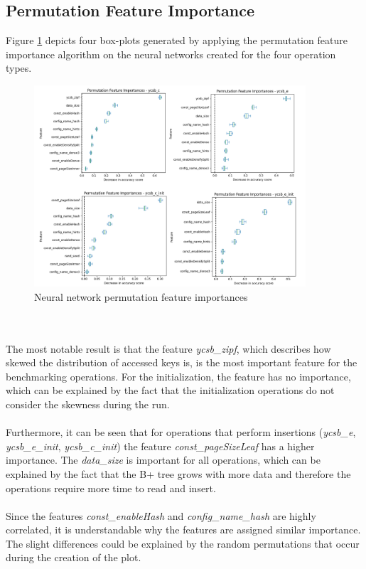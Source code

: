 \subsection{Permutation Feature Importance}
Figure \ref{fig:nnfeatimp} depicts four box-plots generated by applying the permutation feature importance algorithm on the neural networks created for the four operation types.
\begin{figure}[h]
      \centering
      \includegraphics[width=0.9\textwidth]{images/nn_fi.png}
      \caption{Neural network permutation feature importances}
      \label{fig:nnfeatimp}
  \end{figure}
\\\\
The most notable result is that the feature \textit{ycsb\_zipf}, which describes how skewed the distribution of accessed keys is, is the most important feature for the benchmarking operations. For the initialization, the feature has no importance, which can be explained by the fact that the initialization operations do not consider the skewness during the run. 
\\\\
Furthermore, it can be seen that for operations that perform insertions (\textit{ycsb\_e}, \textit{ycsb\_e\_init}, \textit{ycsb\_c\_init}) the feature \textit{const\_pageSizeLeaf} has a higher importance. The \textit{data\_size} is important for all operations, which can be explained by the fact that the B+ tree grows with more data and therefore the operations require more time to read and insert.
\\\\
Since the features \textit{const\_enableHash} and \textit{config\_name\_hash} are highly correlated, it is understandable why the features are assigned similar importance. The slight differences could be explained by the random permutations that occur during the creation of the plot. 
